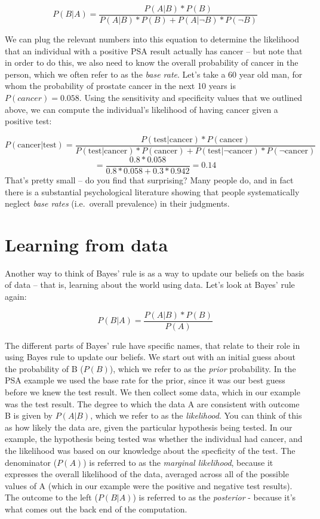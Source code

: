 \documentclass[]{book}
\theoremstyle{definition}
\theoremstyle{definition}
\theoremstyle{definition}
\theoremstyle{remark}
\begin{document}
\[
P(B|A) = \frac{P(A|B)*P(B)}{P(A|B)*P(B) + P(A|\neg B)*P(\neg B)}
\]

We can plug the relevant numbers into this equation to determine the
likelihood that an individual with a positive PSA result actually has
cancer -- but note that in order to do this, we also need to know the
overall probability of cancer in the person, which we often refer to as
the \emph{base rate}. Let's take a 60 year old man, for whom the
probability of prostate cancer in the next 10 years is
\(P(cancer)=0.058\). Using the sensitivity and specificity values that
we outlined above, we can compute the individual's likelihood of having
cancer given a positive test:

\[
P(\text{cancer|test}) = \frac{P(\text{test|cancer})*P(\text{cancer})}{P(\text{test|cancer})*P(\text{cancer}) + P(\text{test|}\neg\text{cancer})*P(\neg\text{cancer})} 
\] \[
= \frac{0.8*0.058}{0.8*0.058 +0.3*0.942 } = 0.14
\] That's pretty small -- do you find that surprising? Many people do,
and in fact there is a substantial psychological literature showing that
people systematically neglect \emph{base rates} (i.e.~overall
prevalence) in their judgments.

\section{Learning from data}\label{learning-from-data-1}

Another way to think of Bayes' rule is as a way to update our beliefs on
the basis of data -- that is, learning about the world using data. Let's
look at Bayes' rule again:

\[
P(B|A) =  \frac{P(A|B)*P(B)}{P(A)}
\]

The different parts of Bayes' rule have specific names, that relate to
their role in using Bayes rule to update our beliefs. We start out with
an initial guess about the probability of B (\(P(B)\)), which we refer
to as the \emph{prior} probability. In the PSA example we used the base
rate for the prior, since it was our best guess before we knew the test
result. We then collect some data, which in our example was the test
result. The degree to which the data A are consistent with outcome B is
given by \(P(A|B)\), which we refer to as the \emph{likelihood}. You can
think of this as how likely the data are, given the particular
hypothesis being tested. In our example, the hypothesis being tested was
whether the individual had cancer, and the likelihood was based on our
knowledge about the specficity of the test. The denominator (\(P(A)\))
is referred to as the \emph{marginal likelihood}, because it expresses
the overall likelihood of the data, averaged across all of the possible
values of A (which in our example were the positive and negative test
results). The outcome to the left (\(P(B|A)\)) is referred to as the
\emph{posterior} - because it's what comes out the back end of the
computation.
\end{document}
